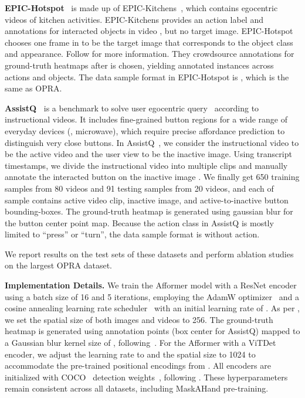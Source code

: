 \documentclass[10pt,twocolumn,letterpaper]{article}
\begin{document}
{\noindent
 \textbf{EPIC-Hotspot}~\cite{hotspot} is made up of EPIC-Kitchens~\cite{epic-kitchens-55}, which contains egocentric videos of kitchen activities. EPIC-Kitchens provides an action label  and annotations for interacted objects in video , but no target image. EPIC-Hotspot chooses one frame in  to be the target image  that corresponds to the object class and appearance. Follow \cite{hotspot} for more information. They crowdsource annotations for ground-truth heatmaps  after  is chosen, yielding  annotated instances across  actions and  objects. The data sample format in EPIC-Hotspot is , which is the same as OPRA.

\noindent
 \textbf{AssistQ~\cite{assistq}} is a benchmark to solve user egocentric query~\cite{assistsr} according to instructional videos. It includes fine-grained button regions for a wide range of everyday devices (\eg, microwave), which require precise affordance prediction to distinguish very close buttons. In AssistQ~\cite{assistq}, we consider the instructional video to be the active video and the user view to be the inactive image. Using transcript timestamps, we divide the instructional video into multiple clips  and manually annotate the interacted button on the inactive image . We finally get 650 training samples from 80 videos and 91 testing samples from 20 videos, and each of sample contains active video clip, inactive image, and active-to-inactive button bounding-boxes. The ground-truth heatmap  is generated using gaussian blur for the button center point map. Because the action class in AssistQ is mostly limited to ``press'' or ``turn'', the data sample format is  without action.

We report results on the test sets of these datasets and perform ablation studies on the largest OPRA dataset.

\noindent\textbf{Implementation Details.} We train the Afformer model with a ResNet encoder using a batch size of 16 and 5 iterations, employing the AdamW optimizer~\cite{adamw} and a cosine annealing learning rate scheduler~\cite{cosineanealinglr} with an initial learning rate of . As per \cite{demo2vec}, we set the spatial size of both images and videos to 256. The ground-truth heatmap is generated using annotation points (box center for AssistQ) mapped to a Gaussian blur kernel size of , following~\cite{demo2vec,hotspot}. For the Afformer with a ViTDet encoder, we adjust the learning rate to  and the spatial size to 1024 to accommodate the pre-trained positional encodings from \cite{vitdet}. All encoders are initialized with COCO~\cite{coco} detection weights~\cite{faster_rcnn,vitdet}, following \cite{demo2vec}. These hyperparameters remain consistent across all datasets, including MaskAHand pre-training.

}
\end{document}
